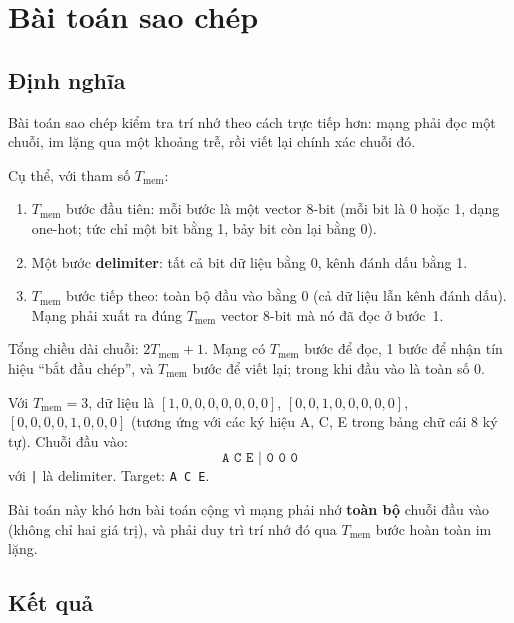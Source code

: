 %

\section{Bài toán sao chép}
\label{sec:ch02-copy}

%

\subsection{Định nghĩa}

Bài toán sao chép kiểm tra trí nhớ theo cách trực tiếp hơn: mạng phải đọc một
chuỗi, im lặng qua một khoảng trễ, rồi viết lại chính xác chuỗi đó.

Cụ thể, với tham số $T_{\text{mem}}$:
\begin{enumerate}
  \item $T_{\text{mem}}$ bước đầu tiên: mỗi bước là một vector 8-bit (mỗi
    bit là 0 hoặc 1, dạng one-hot; tức chỉ một bit bằng 1, bảy bit còn lại
    bằng 0).
  \item Một bước \textbf{delimiter}: tất cả bit dữ liệu bằng 0, kênh đánh
    dấu bằng 1.
  \item $T_{\text{mem}}$ bước tiếp theo: toàn bộ đầu vào bằng 0 (cả dữ liệu
    lẫn kênh đánh dấu). Mạng phải xuất ra đúng $T_{\text{mem}}$ vector 8-bit
    mà nó đã đọc ở bước~1.
\end{enumerate}

Tổng chiều dài chuỗi: $2T_{\text{mem}} + 1$. Mạng có $T_{\text{mem}}$ bước
để đọc, 1 bước để nhận tín hiệu ``bắt đầu chép'', và $T_{\text{mem}}$ bước
để viết lại; trong khi đầu vào là toàn số 0.

\begin{example}
Với $T_{\text{mem}} = 3$, dữ liệu là $[1,0,0,0,0,0,0,0]$,
$[0,0,1,0,0,0,0,0]$, $[0,0,0,0,1,0,0,0]$ (tương ứng với các ký hiệu A, C,
E trong bảng chữ cái 8 ký tự). Chuỗi đầu vào:
\[
\texttt{A C E | 0 0 0}
\]
với \texttt{|} là delimiter. Target: \texttt{A C E}.
\end{example}

Bài toán này khó hơn bài toán cộng vì mạng phải nhớ \textbf{toàn bộ} chuỗi
đầu vào (không chỉ hai giá trị), và phải duy trì trí nhớ đó qua $T_{\text{mem}}$
bước hoàn toàn im lặng.

\subsection{Kết quả}

